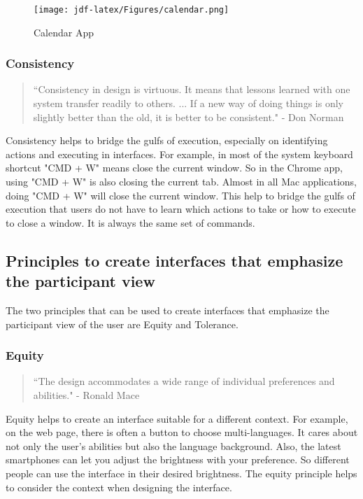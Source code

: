 \documentclass[
	letterpaper, %
]{jdf}
\begin{document}
\begin{figure}[h]
	\centering
	\texttt{[image: jdf-latex/Figures/calendar.png]}
	\caption{Calendar App}
	\label{fig:calendar}
\end{figure}

\subsubsection{Consistency}
\begin{quotation}
\noindent “Consistency in design is virtuous. It means that lessons learned with one system transfer readily to others. ... If a new way of doing things is only slightly better than the old, it is better to be consistent."
- Don Norman
\end{quotation}

Consistency helps to bridge the gulfs of execution, especially on identifying actions and executing in interfaces. For example, in most of the system keyboard shortcut "CMD + W" means close the current window. So in the Chrome app, using "CMD + W" is also closing the current tab. Almost in all Mac applications, doing "CMD + W" will close the current window. This help to bridge the gulfs of execution that users do not have to learn which actions to take or how to execute to close a window. It is always the same set of commands.

\subsection{Principles to create interfaces that emphasize the participant view}
The two principles that can be used to create interfaces that emphasize the participant view of the user are Equity and Tolerance.

\subsubsection{Equity}
\begin{quotation}
\noindent “The design accommodates a wide range of individual preferences and abilities."
- Ronald Mace
\end{quotation}

Equity helps to create an interface suitable for a different context. For example, on the web page, there is often a button to choose multi-languages. It cares about not only the user's abilities but also the language background. Also, the latest smartphones can let you adjust the brightness with your preference. So different people can use the interface in their desired brightness. The equity principle helps to consider the context when designing the interface.
\end{document}
